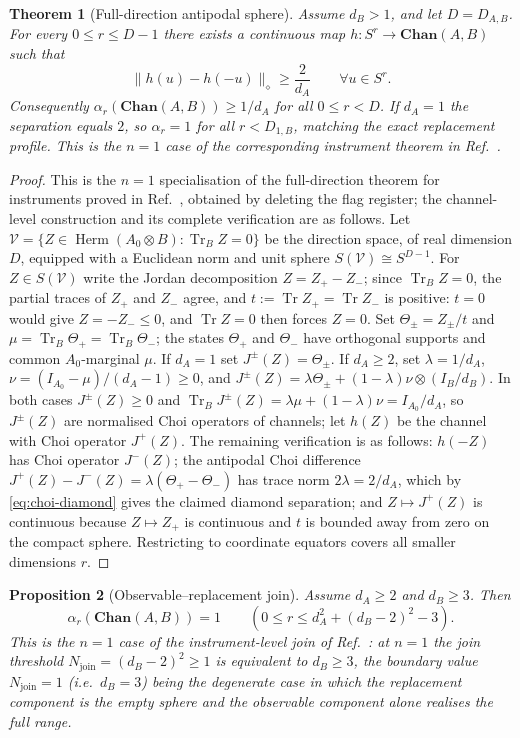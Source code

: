 \documentclass[11pt,a4paper]{article}
\theoremstyle{definition}
\theoremstyle{plain}
\newtheorem{theorem}{Theorem}[section]
\newtheorem{proposition}[theorem]{Proposition}
\theoremstyle{remark}
\DeclareMathOperator{\Tr}{Tr}
\DeclareMathOperator{\Herm}{Herm}
\newcommand{\Chan}{\mathbf{Chan}}
\begin{document}
\begin{theorem}[Full-direction antipodal sphere]
\label{thm:full-direction-channel}
Assume $d_B>1$, and let $D=D_{A,B}$. For every $0\le r\le D-1$ there
exists a continuous map $h:S^r\to\Chan(A,B)$ such that
\[
\|h(u)-h(-u)\|_\diamond\ge\frac2{d_A}
\qquad\forall u\in S^r.
\]
Consequently $\alpha_r(\Chan(A,B))\ge1/d_A$ for all $0\le r<D$. If
$d_A=1$ the separation equals $2$, so $\alpha_r=1$ for all $r<D_{1,B}$,
matching the exact replacement profile. This is the $n=1$ case of
the corresponding instrument theorem in Ref.~\cite{CompanionInstruments}.
\end{theorem}

\begin{proof}
This is the $n=1$ specialisation of the full-direction theorem for instruments proved in Ref.~\cite{CompanionInstruments}, obtained by deleting the flag register; the channel-level construction and its complete verification are as follows. Let $\mathcal V=\{Z\in\Herm(A_0\otimes B):\Tr_BZ=0\}$ be the direction space, of real dimension $D$, equipped with a Euclidean norm and unit sphere $S(\mathcal V)\cong S^{D-1}$. For $Z\in S(\mathcal V)$ write the Jordan decomposition $Z=Z_+-Z_-$; since $\Tr_BZ=0$, the partial traces of $Z_+$ and $Z_-$ agree, and $t:=\Tr Z_+=\Tr Z_-$ is positive: $t=0$ would give $Z=-Z_-\le0$, and $\Tr Z=0$ then forces $Z=0$. Set $\Theta_\pm=Z_\pm/t$ and $\mu=\Tr_B\Theta_+=\Tr_B\Theta_-$; the states $\Theta_+$ and $\Theta_-$ have orthogonal supports and common $A_0$-marginal $\mu$. If $d_A=1$ set $J^\pm(Z)=\Theta_\pm$. If $d_A\ge2$, set $\lambda=1/d_A$, $\nu=(I_{A_0}-\mu)/(d_A-1)\ge0$, and $J^\pm(Z)=\lambda\Theta_\pm+(1-\lambda)\nu\otimes(I_B/d_B)$. In both cases $J^\pm(Z)\ge0$ and $\Tr_BJ^\pm(Z)=\lambda\mu+(1-\lambda)\nu=I_{A_0}/d_A$, so $J^\pm(Z)$ are normalised Choi operators of channels; let $h(Z)$ be the channel with Choi operator $J^+(Z)$. The remaining verification is as follows: $h(-Z)$ has Choi operator $J^-(Z)$; the antipodal Choi difference $J^+(Z)-J^-(Z)=\lambda(\Theta_+-\Theta_-)$ has trace norm $2\lambda=2/d_A$, which by \eqref{eq:choi-diamond} gives the claimed diamond separation; and $Z\mapsto J^+(Z)$ is continuous because $Z\mapsto Z_+$ is continuous and $t$ is bounded away from zero on the compact sphere. Restricting to coordinate equators covers all smaller dimensions $r$.
\end{proof}

\begin{proposition}[Observable--replacement join]
\label{prop:join-channel}
Assume $d_A\ge2$ and $d_B\ge3$. Then
\[
\alpha_r(\Chan(A,B))=1
\qquad(0\le r\le d_A^2+(d_B-2)^2-3).
\]
This is the $n=1$ case of the instrument-level join of
Ref.~\cite{CompanionInstruments}: at $n=1$ the join threshold
$N_{\mathrm{join}}=(d_B-2)^2\ge1$ is equivalent to $d_B\ge3$, the boundary
value $N_{\mathrm{join}}=1$ (i.e.\ $d_B=3$) being the degenerate case in which
the replacement component is the empty sphere and the observable component
alone realises the full range.
\end{proposition}
\end{document}

